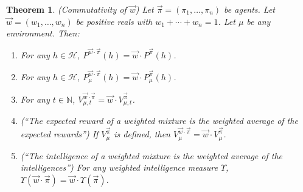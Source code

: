 \documentclass[twoside]{article}
\newtheorem{theorem}{Theorem}
\begin{document}
\begin{theorem}
\label{maintheorem}
    (Commutativity of $\vec w$)
    Let $\vec\pi=(\pi_1,\ldots,\pi_n)$ be agents.
    Let $\vec w=(w_1,\ldots,w_n)$ be positive reals with
    $w_1+\cdots+w_n=1$. Let $\mu$ be any environment.
    Then:
    \begin{enumerate}
        \item
        For any $h\in\mathcal H$,
        $P^{\vec w\cdot \vec\pi}(h)=\vec w\cdot {P^{\vec\pi}}(h)$.
        \item
        For any $h\in\mathcal H$,
        $P^{\vec w\cdot \vec\pi}_\mu(h)=\vec w \cdot P^{\vec\pi}_\mu(h)$.
        \item
        For any $t\in\mathbb N$,
        $V^{\vec w\cdot \vec\pi}_{\mu,t}=\vec w\cdot V^{\vec\pi}_{\mu,t}$.
        \item
        (``The expected reward of a weighted mixture is the weighted
        average of the expected rewards'')
        If $V^{\vec\pi}_\mu$ is defined, then
        $V^{\vec w\cdot\vec\pi}_\mu=\vec w\cdot V^{\vec\pi}_\mu$.
        \item
        (``The intelligence of a weighted mixture is the weighted average
        of the intelligences'')
        For any weighted intelligence measure $\Upsilon$,
        $\Upsilon(\vec w\cdot\vec\pi)=\vec w\cdot\Upsilon(\vec\pi)$.
    \end{enumerate}
\end{theorem}
\end{document}
